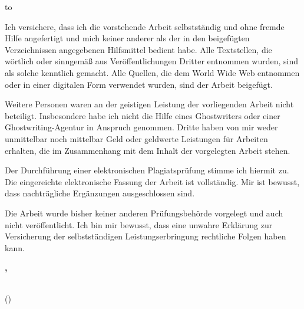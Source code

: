 
\cleardoublepage
\vspace*{20\baselineskip}
\hbox to \textwidth{\hrulefill}
\par

Ich versichere, dass ich die vorstehende Arbeit selbstständig und ohne fremde Hilfe angefertigt und mich keiner anderer als der in den beigefügten Verzeichnissen angegebenen Hilfsmittel bedient habe.
Alle Textstellen, die wörtlich oder sinngemäß aus Veröffentlichungen Dritter entnommen wurden, sind als solche kenntlich gemacht.
Alle Quellen, die dem World Wide Web entnommen oder in einer digitalen Form verwendet wurden, sind der Arbeit beigefügt.

Weitere Personen waren an der geistigen Leistung der vorliegenden Arbeit nicht beteiligt.
Insbesondere habe ich nicht die Hilfe eines Ghostwriters oder einer Ghostwriting-Agentur in Anspruch genommen.
Dritte haben von mir weder unmittelbar noch mittelbar Geld oder geldwerte Leistungen für Arbeiten erhalten, die im Zusammenhang mit dem Inhalt der vorgelegten Arbeit stehen.

Der Durchführung einer elektronischen Plagiatsprüfung stimme ich hiermit zu.
Die eingereichte elektronische Fassung der Arbeit ist vollständig.
Mir ist bewusst, dass nach\-träg\-li\-che Ergänzungen ausgeschlossen sind.

Die Arbeit wurde bisher keiner anderen Prüfungsbehörde vorgelegt und auch nicht veröffentlicht.
Ich bin mir bewusst, dass eine unwahre Erklärung zur Versicherung der selbstständigen Leistungserbringung rechtliche Folgen haben kann.

\vspace*{2\baselineskip}

\textbf{\place, \submissionTime}
\vspace{1.5cm}

\dotfill\hspace*{8.0cm}\\
\hspace*{2cm}(\authorName) %

\thispagestyle{empty}